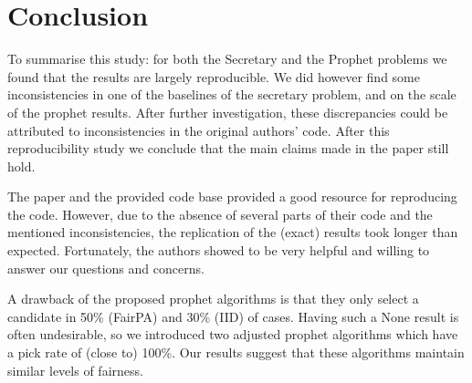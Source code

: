 




\section{Conclusion}

To summarise this study: for both the Secretary and the Prophet problems we found that the results are largely reproducible. We did however find some inconsistencies in one of the baselines of the secretary problem, and on the scale of the prophet results.
After further investigation, these discrepancies could be attributed to inconsistencies in the original authors' code. After this reproducibility study we conclude that the main claims made in the paper still hold. 

The paper and the provided code base provided a good resource for reproducing the code. However, due to the absence of several parts of their code and the mentioned inconsistencies, the replication of the (exact) results took longer than expected. Fortunately, the authors showed to be very helpful and willing to answer our questions and concerns.

A drawback of the proposed prophet algorithms is that they only select a candidate in 50\% (FairPA) and 30\% (IID) of cases. Having such a None result is often undesirable, so we introduced two adjusted prophet algorithms which have a pick rate of (close to) 100\%. Our results suggest that these algorithms maintain similar levels of fairness.

